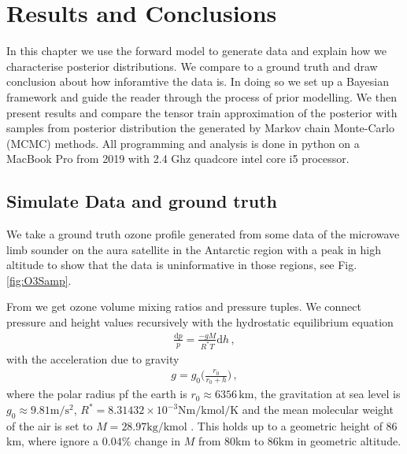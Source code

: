 \chapter{Results and Conclusions}
\label{ch:res}

In this chapter we use the forward model to generate data and explain how we characterise posterior distributions.
We compare to a ground truth and draw conclusion about how inforamtive the data is.
In doing so we set up a Bayesian framework and guide the reader through the process of prior modelling.
We then present results and compare the tensor train approximation of the posterior with samples from posterior distribution the generated by Markov chain Monte-Carlo (MCMC) methods.
All programming and analysis is done in python on a MacBook Pro from 2019 with 2.4 Ghz quadcore intel core i5 processor.

\section{Simulate Data and ground truth}
We take a ground truth ozone profile generated from some data \cite{MLSdata} of the microwave limb sounder on the aura satellite in the Antarctic region with a peak in high altitude to show that the data is uninformative in those regions, see Fig. \ref{fig:O3Samp}.

From \cite{MLSdata} we get ozone volume mixing ratios and pressure tuples.
We connect pressure and height values recursively with the hydrostatic equilibrium equation
\begin{align}
	\frac{\text{d}p}{p} = \frac{- g M}{R^* T} \text{d} h \, ,
\end{align}
with the acceleration due to gravity
\begin{align}
	g = g_0 \Bigg( \frac{r_0}{r_0 + h} \Bigg) \, ,
\end{align}
where the polar radius pf the earth is $r_0 \approx 6356 \, \text{km}$, the gravitation at sea level is $g_0 \approx 9.81 \text{m}/\text{s}^2$, $R^* = 8.31432 \times 10^{-3} \text{Nm} / \text{kmol} / \text{K}$ and the mean molecular weight of the air is set to $M = 28.97 \text{kg/kmol}$ \cite{atmosphere1976us}.
This holds up to a geometric height of $86$km, where ignore a $0.04\%$ change in $M$ from $80$km to $86$km in geometric altitude.


